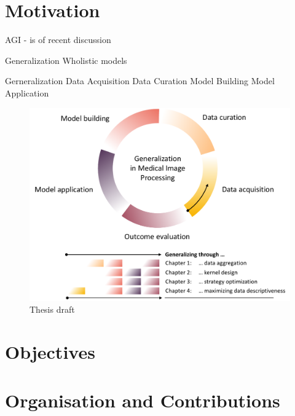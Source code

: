 \section{Motivation}


AGI - is of recent discussion

Generalization
Wholistic models


Gerneralization
Data Acquisition
Data Curation
Model Building
Model Application

\begin{figure}
    \label{fig:draft}
    \includegraphics[width=\textwidth]{sections/01_introduction/figures/draft.pdf}
    \caption{Thesis draft}

\end{figure}
\section{Objectives}
\section{Organisation and Contributions}